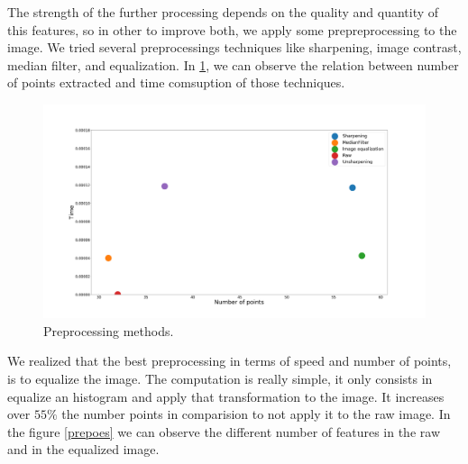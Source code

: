 \documentclass[12pt, a4paper, titlepage,twoside,openright]{article}
\begin{document}
 
The strength of the further processing depends on the quality and quantity of this features, so in other to improve both, we apply some prepreprocessing to the image. We tried several preprocessings techniques like sharpening, image contrast, median filter, and equalization. In \ref{track1w}, we can observe the relation between number of points extracted and time comsuption of those techniques.



\begin{figure}[H]
\centering         
\includegraphics[width=0.9\linewidth]{tracker/preprocesing.png}
\caption{Preprocessing methods.} \label{track1w}
\end{figure}

We realized that the best preprocessing in terms of speed and number of points, is to equalize the image. The computation is really simple, it only consists in equalize an histogram and apply that transformation to the image. It increases over $ 55 \%$ the number points in comparision to not apply it to the raw image. In the figure \ref{prepoes} we can observe the different number of features in the raw and in the equalized image.
\end{document}
